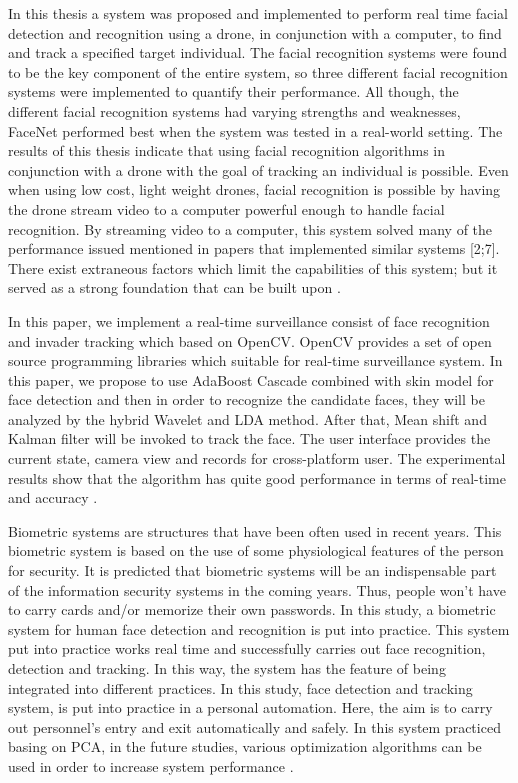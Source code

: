 In this thesis a system was proposed and implemented to perform real time facial detection and recognition using a drone, in conjunction with a computer, to find and track a specified target individual. The facial recognition systems were found to be the key component of the entire system, so three different facial recognition systems were implemented to quantify their performance. All though, the different facial recognition systems had varying strengths and weaknesses, FaceNet performed best when the system was tested in a real-world setting. The results of this thesis indicate that using facial recognition algorithms in conjunction with a drone with the goal of tracking an individual is possible. Even when using low cost, light weight drones, facial recognition is possible by having the drone stream video to a computer powerful enough to handle facial recognition. By streaming video to a computer, this system solved many of the performance issued mentioned in papers that implemented similar systems [2;7]. There exist extraneous factors which limit the capabilities of this system; but it served as a strong foundation that can be built upon \cite{FacialRecognitionAndTrackingWithDrone}.

In this paper, we implement a real-time surveillance 
consist of face recognition and invader tracking which based 
on OpenCV. OpenCV provides a set of open source 
programming libraries which suitable for real-time 
surveillance system. In this paper, we propose to use 
AdaBoost Cascade combined with skin model for face 
detection and then in order to recognize the candidate faces, 
they will be analyzed by the hybrid Wavelet and LDA method. 
After that, Mean shift and Kalman filter will be invoked to 
track the face. The user interface provides the current state, 
camera view and records for cross-platform user. The 
experimental results show that the algorithm has quite good 
performance in terms of real-time and accuracy \cite{ChaoYangAndChao}.

Biometric systems are structures that have been often used in 
recent years. This biometric system is based on the use of 
some physiological features of the person for security. It is 
predicted that biometric systems will be an indispensable 
part of the information security systems in the coming years. 
Thus, people won’t have to carry cards and/or memorize 
their own passwords. 
In this study, a biometric system for human face detection
and recognition is put into practice. This system put into 
practice works real time and successfully carries out face 
recognition, detection and tracking. In this way, the system 
has the feature of being integrated into different practices. In 
this study, face detection and tracking system, is put into 
practice in a personal automation. Here, the aim is to carry 
out personnel’s entry and exit automatically and safely. In 
this system practiced basing on PCA, in the future studies, 
various optimization algorithms can be used in order to 
increase system performance \cite{MuhammetAndDas}.


